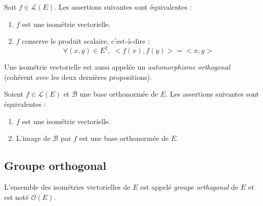 \documentclass[a4paper,10pt]{report}
\begin{document}
\begin{preuve}

\vspace{2.5cm}
\end{preuve}

\begin{prop}
Soit $f \in \mathcal{L}(E)$. Les assertions suivantes sont équivalentes :
\begin{enumerate}
\item $f$ est une isométrie vectorielle.
\item $f$ conserve le produit scalaire, c'est-à-dire :
$$ \forall (x,y) \in E^2, \; <f(x),f(y)>=<x,y> $$
\end{enumerate}
\end{prop}

\begin{rem} Une isométrie vectorielle est aussi appelée un \textit{automorphisme orthogonal} (cohérent avec les deux dernières propositions).
\end{rem}

\begin{preuve}
\vspace{7cm}
\end{preuve}

\begin{prop}
Soient $f \in \mathcal{L}(E)$ et $\mathcal{B}$ une base orthonormée de $E$. Les assertions suivantes sont équivalentes :
\begin{enumerate}
\item $f$ est une isométrie vectorielle.
\item L'image de $\mathcal{B}$ par $f$ est une base orthonormée de $E$.
\end{enumerate}
\end{prop}

\begin{preuve}
\vspace{7cm}
\end{preuve}

\subsection{Groupe orthogonal}

\begin{defin} L'ensemble des isométries vectorielles de $E$ est appelé \textit{groupe orthogonal} de $E$ et est noté $\mathcal{O}(E)$. 
\end{defin}
\end{document}
